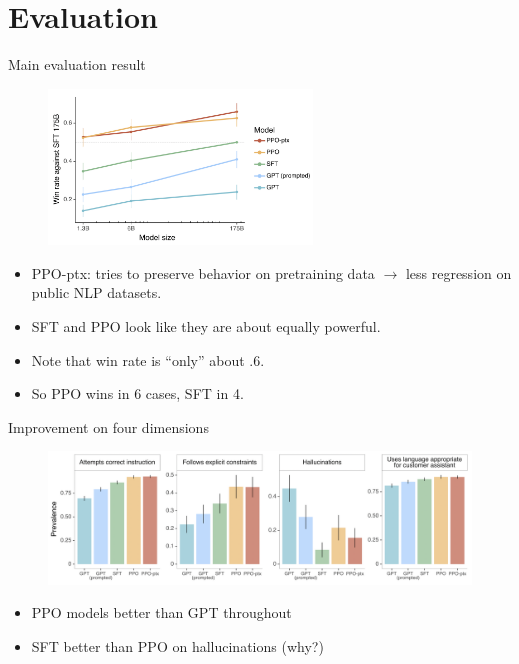 


\section{Evaluation}





\begin{vbframe}{Main evaluation result}

\vfill

\begin{figure}
\centering
\includegraphics[width = 7cm]{figure/mainresult.png}
\end{figure}

\begin{itemize}
	\item PPO-ptx: tries to preserve behavior on
	pretraining data $\rightarrow$ less regression on
	public NLP datasets.
	\item SFT and PPO look like they are about equally
	powerful.
        \item Note that win rate is ``only'' about .6.
        \item So PPO wins in 6 cases, SFT in 4.
\end{itemize}

\vfill

\end{vbframe}

\begin{vbframe}{Improvement on four dimensions}

\vfill

\begin{figure}
\centering
\includegraphics[width = 12cm]{figure/evaluationon4categories.png}
\end{figure}

\begin{itemize}
	\item PPO models better than GPT throughout
	\item SFT better than PPO on hallucinations (why?)
\end{itemize}

\vfill

\end{vbframe}

